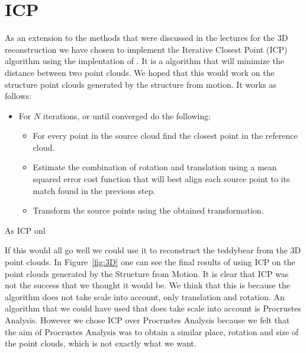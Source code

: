 \section{ICP}
\label{ICP}
As an extension to the methods that were discussed in the lectures for the 3D reconstruction we have chosen to implement the Iterative Closest Point (ICP) algorithm using the implentation of . It is a algorithm that will minimize the distance between two point clouds. We hoped that this would work on the structure point clouds generated by the structure from motion. It works as follows:

\begin{itemize}
	\item For $N$ iterations, or until converged do the following:
	\begin{itemize}
		\item For every point in the source cloud find the closest point in the reference cloud.
		\item Estimate the combination of rotation and translation using a mean squared error cost function that will best align each source point to its match found in the previous step.
		\item Transform the source points using the obtained transformation.
	\end{itemize}
\end{itemize}

As ICP onl

If this would all go well we could use it to reconstruct the teddybear from the 3D point clouds. In Figure~\ref{fig:3D} one can see the final results of using ICP on the point clouds generated by the Structure from Motion. It is clear that ICP was not the success that we thought it would be. We think that this is because the algorithm does not take scale into account, only translation and rotation. An algorithm that we could have used that does take scale into account is Procrustes Analysis\cite{procrustes}. However we chose ICP over Procrustes Analysis because we felt that the aim of Procrustes Analysis was to obtain a similar place, rotation and size of the point clouds, which is not exactly what we want.


